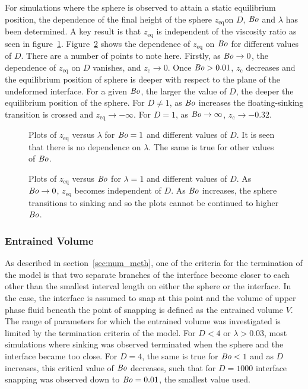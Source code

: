 \documentclass[12pt]{article}
\newcommand\Bo{\mbox{\textit{Bo}}}  %
\begin{document}
For simulations where the sphere is observed to attain a static equilibrium position, the dependence of the final height of the sphere $z_{\text{eq}}$on $D$, $\Bo$ and $\lambda$ has been determined. A key result is that $z_{\text{eq}}$ is independent of the viscosity ratio as seen in figure~\ref{fig:fin_pos_viscos}. Figure~\ref{fig:fin_pos} shows the dependence of $z_{\text{eq}}$ on $\Bo$ for different values of $D$. There are a number of points to note here. Firstly, as $\Bo \to 0$, the dependence of $z_{\text{eq}}$ on $D$ vanishes, and $z_{\text{c}} \to 0$. Once $\Bo > 0.01$, $z_{\text{c}}$ decreases and the equilibrium position of sphere is deeper with respect to the plane of the undeformed interface. For a given $\Bo$, the larger the value of $D$, the deeper the equilibrium position of the sphere. For $D \neq 1$, as $\Bo$ increases the floating-sinking transition is crossed and $z_{\text{eq}} \to -\infty$. For $D = 1$, as $\Bo \to \infty$, $z_{\text{c}} \to -0.32$. 

  \begin{figure}
    \resizebox{0.9\textwidth}{!}{\large }
    \caption{Plots of $z_{\text{eq}}$ versus $\lambda$ for $\Bo = 1$ and different values of $D$. It is seen that there is no dependence on $\lambda$. The same is true for other values of $\Bo$. \label{fig:fin_pos_viscos}}
  \end{figure}

  \begin{figure}
    \resizebox{0.9\textwidth}{!}{\large }
    \caption{Plots of $z_{\text{eq}}$ versus $\Bo$ for $\lambda = 1$ and different values of $D$. As $\Bo \to 0$, $z_{\text{eq}}$ becomes independent of $D$. As $\Bo$ increases, the sphere transitions to sinking and so the plots cannot be continued to higher $\Bo$. \label{fig:fin_pos}}
  \end{figure}

\subsubsection{Entrained Volume}
\label{subsubsec:ent_vol_res}

As described in section~\ref{sec:num_meth}, one of the criteria for the termination of the model is that two separate branches of the interface become closer to each other than the smallest interval length on either the sphere or the interface. In the case, the interface is assumed to snap at this point and the volume of upper phase fluid beneath the point of snapping is defined as the entrained volume $V$. The range of parameters for which the entrained volume was investigated is limited by the termination criteria of the model. For $D < 4$ or $\lambda > 0.03$, most simulations where sinking was observed terminated when the sphere and the interface became too close. For $D = 4$, the same is true for $\Bo <1$ and as $D$ increases, this critical value of $\Bo$ decreases, such that for $D = 1000$ interface snapping was observed down to $\Bo = 0.01$, the smallest value used.
\end{document}
